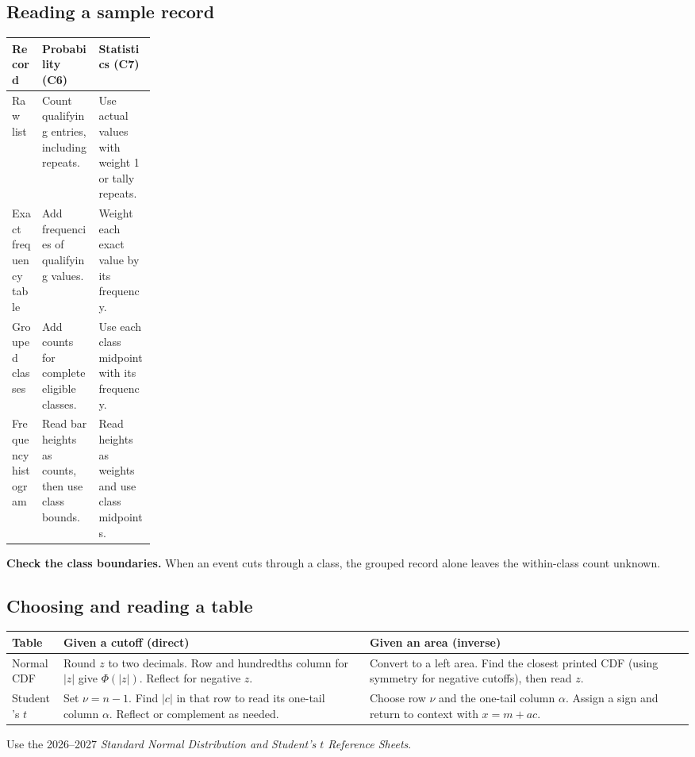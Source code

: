 \subsection*{Reading a sample record}
{\small
\begin{tabularx}{\linewidth}{@{}L{0.21\linewidth}YY@{}}
\toprule
\textbf{Record} & \textbf{Probability (C6)} & \textbf{Statistics (C7)}\\
\midrule
Raw list & Count qualifying entries, including repeats. & Use actual values with weight 1 or tally repeats.\\
Exact frequency table & Add frequencies of qualifying values. & Weight each exact value by its frequency.\\
Grouped classes & Add counts for complete eligible classes. & Use each class midpoint with its frequency.\\
Frequency histogram & Read bar heights as counts, then use class bounds. & Read heights as weights and use class midpoints.\\
\bottomrule
\end{tabularx}
}
\par\smallskip\textbf{Check the class boundaries.} When an event cuts through a class, the grouped record alone leaves the within-class count unknown.

\subsection*{Choosing and reading a table}
{\small
\begin{tabularx}{\linewidth}{@{}l YY@{}}
\toprule
\textbf{Table} & \textbf{Given a cutoff (direct)} & \textbf{Given an area (inverse)}\\
\midrule
Normal CDF & Round \(z\) to two decimals. Row and hundredths column for \(|z|\) give \(\Phi(|z|)\). Reflect for negative \(z\). & Convert to a left area. Find the closest printed CDF (using symmetry for negative cutoffs), then read \(z\).\\
Student's \(t\) & Set \(\nu=n-1\). Find \(|c|\) in that row to read its one-tail column \(\alpha\). Reflect or complement as needed. & Choose row \(\nu\) and the one-tail column \(\alpha\). Assign a sign and return to context with \(x=m+ac\).\\
\bottomrule
\end{tabularx}
}
\par\smallskip Use the 2026--2027 \emph{Standard Normal Distribution and Student's \(t\) Reference Sheets}.

